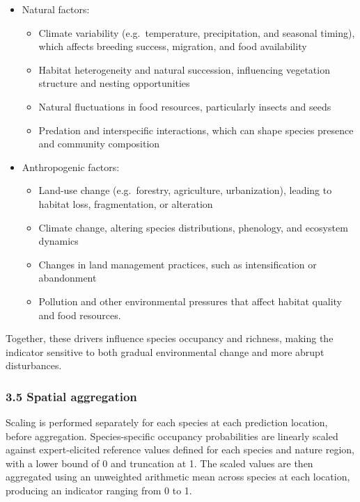 \documentclass[
  letterpaper,
  DIV=11,
  numbers=noendperiod]{scrartcl}
\providecommand{\tightlist}{%
  \setlength{\itemsep}{0pt}\setlength{\parskip}{0pt}}
\begin{document}
\begin{itemize}
\item
  Natural factors:

  \begin{itemize}
  \tightlist
  \item
    Climate variability (e.g.~temperature, precipitation, and seasonal
    timing), which affects breeding success, migration, and food
    availability
  \item
    Habitat heterogeneity and natural succession, influencing vegetation
    structure and nesting opportunities
  \item
    Natural fluctuations in food resources, particularly insects and
    seeds
  \item
    Predation and interspecific interactions, which can shape species
    presence and community composition
  \end{itemize}
\item
  Anthropogenic factors:

  \begin{itemize}
  \tightlist
  \item
    Land-use change (e.g.~forestry, agriculture, urbanization), leading
    to habitat loss, fragmentation, or alteration
  \item
    Climate change, altering species distributions, phenology, and
    ecosystem dynamics
  \item
    Changes in land management practices, such as intensification or
    abandonment
  \item
    Pollution and other environmental pressures that affect habitat
    quality and food resources.
  \end{itemize}
\end{itemize}

Together, these drivers influence species occupancy and richness, making
the indicator sensitive to both gradual environmental change and more
abrupt disturbances.

\subsubsection{3.5 Spatial aggregation}\label{spatial-aggregation}

Scaling is performed separately for each species at each prediction
location, before aggregation. Species-specific occupancy probabilities
are linearly scaled against expert-elicited reference values defined for
each species and nature region, with a lower bound of 0 and truncation
at 1. The scaled values are then aggregated using an unweighted
arithmetic mean across species at each location, producing an indicator
ranging from 0 to 1.
\end{document}
